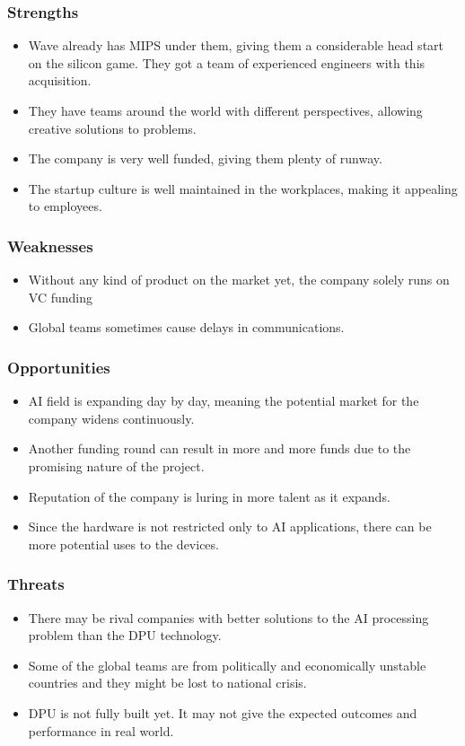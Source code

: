 \subsubsection*{Strengths}

\begin{itemize}
    \item Wave already has MIPS under them, giving them a considerable head start on the silicon game. They got a team of experienced engineers with this acquisition.
    \item They have teams around the world with different perspectives, allowing creative solutions to problems.
    \item The company is very well funded, giving them plenty of runway.
    \item The startup culture is well maintained in the workplaces, making it appealing to employees.
\end{itemize}


\subsubsection*{Weaknesses}
\begin{itemize}
    \item Without any kind of product on the market yet, the company solely runs on VC funding
    \item Global teams sometimes cause delays in communications.
\end{itemize}


\subsubsection*{Opportunities}
\begin{itemize}
    \item AI field is expanding day by day, meaning the potential market for the company widens continuously.
    \item Another funding round can result in more and more funds due to the promising nature of the project.
    \item Reputation of the company is luring in more talent as it expands.
    \item Since the hardware is not restricted only to AI applications, there can be more potential uses to the devices.
\end{itemize}

\subsubsection*{Threats}
\begin{itemize}
    \item There may be rival companies with better solutions to the AI processing problem than the DPU technology.
    \item Some of the global teams are from politically and economically unstable countries and they might be lost to national crisis.
    \item DPU is not fully built yet. It may not give the expected outcomes and performance in real world.
\end{itemize}

